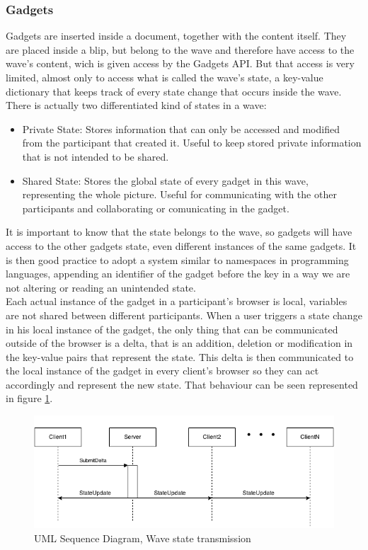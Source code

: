 \subsubsection{Gadgets}
Gadgets are inserted inside a document, together with the content itself. They are placed inside a blip, but belong to the wave and therefore have access to the wave's content, wich is given access by the Gadgets API. But that access is very limited, almost only to access what is called the wave's state, a key-value dictionary that keeps track of every state change that occurs inside the wave.\\[.2cm]
There is actually two differentiated kind of states in a wave:
\begin{itemize}
  \item Private State: Stores information that can only be accessed and modified from the participant that created it. Useful to keep stored private information that is not intended to be shared.
  \item Shared State: Stores the global state of every gadget in this wave, representing the whole picture. Useful for communicating with the other participants and collaborating or comunicating in the gadget.
\end{itemize}
It is important to know that the state belongs to the wave, so gadgets will have access to the other gadgets state, even different instances of the same gadgets. It is then good practice to adopt a system similar to namespaces in programming languages, appending an identifier of the gadget before the key in a way we are not altering or reading an unintended state.\\[.2cm]
Each actual instance of the gadget in a participant's browser is local, variables are not shared between different participants. When a user triggers a state change in his local instance of the gadget, the only thing that can be communicated outside of the browser is a delta, that is an addition, deletion or modification in the key-value pairs that represent the state. This delta is then communicated to the local instance of the gadget in every client's browser so they can act accordingly and represent the new state. That behaviour can be seen represented in figure \ref{fig:wave_state}.
\begin{figure}[H]
  \center
    \includegraphics[keepaspectratio, scale=0.6]{Media/Diagrams/Wave/StateSequence.png}
  \caption{UML Sequence Diagram, Wave state transmission}
  \label{fig:wave_state}
\end{figure}
